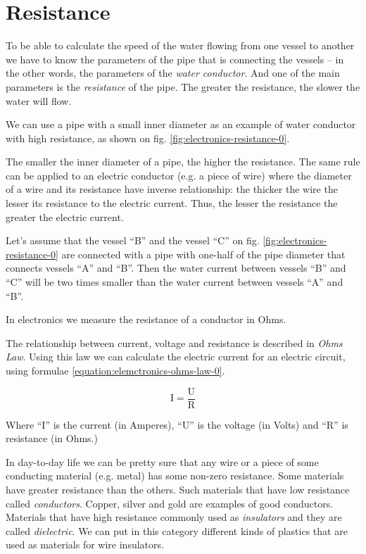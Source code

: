\documentclass[../sparc.tex]{subfiles}
\begin{document}
\section{Resistance}
\label{section:electronics-resistance}

To be able to calculate the speed of the water flowing from one vessel to
another we have to know the parameters of the pipe that is connecting the
vessels -- in the other words, the parameters of the \emph{water conductor}.
And one of the main parameters is the \emph{resistance} of the pipe.  The
greater the resistance, the slower the water will flow.

We can use a pipe with a small inner diameter as an example of water conductor
with high resistance, as shown on fig. \ref{fig:electronics-resistance-0}.


The smaller the inner diameter of a pipe, the higher the resistance.  The same
rule can be applied to an electric conductor (e.g. a piece of wire) where the
diameter of a wire and its resistance have inverse relationship: the thicker the
wire the lesser its resistance to the electric current.  Thus, the lesser the
resistance the greater the electric current.

Let's assume that the vessel ``B'' and the vessel ``C'' on
fig. \ref{fig:electronics-resistance-0} are connected with a pipe with one-half
of the pipe diameter that connects vessels ``A'' and ``B''.  Then the water
current between vessels ``B'' and ``C'' will be two times smaller than the water
current between vessels ``A'' and ``B''.

In electronics we measure the resistance of a conductor in Ohms.

The relationship between current, voltage and resistance is described in
\emph{Ohms Law}.  Using this law we can calculate the electric current for an
electric circuit, using formulae \ref{equation:elemctronics-ohms-law-0}.

\begin{equation}
  \mbox{I} = \frac{\mbox{U}}{\mbox{R}}
  \label{equation:elemctronics-ohms-law-0}
\end{equation}

Where ``I'' is the current (in Amperes), ``U'' is the voltage (in Volts) and
``R'' is resistance (in Ohms.)

In day-to-day life we can be pretty sure that any wire or a piece of some
conducting material (e.g. metal) has some non-zero resistance.  Some materials
have greater resistance than the others.  Such materials that have low
resistance called \emph{conductors}.  Copper, silver and gold are examples of
good conductors.  Materials that have high resistance commonly used as
\emph{insulators} and they are called \emph{dielectric}.  We can put in this
category different kinds of plastics that are used as materials for wire
insulators.
\end{document}
